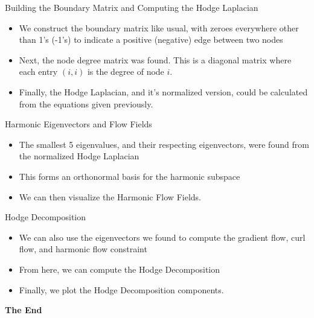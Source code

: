 \documentclass[aspectratio=169,xcolor=dvipsnames]{beamer}
\begin{document}
\begin{frame}{Building the Boundary Matrix and Computing the Hodge Laplacian}
    \begin{itemize}
        \item We construct the boundary matrix like usual, with zeroes everywhere other than 1's (-1's) to indicate a positive (negative) edge between two nodes
        \item Next, the node degree matrix was found. This is a diagonal matrix where each entry $(i,i)$ is the degree of node $i$. 
        \item Finally, the Hodge Laplacian, and it's normalized version, could be calculated from the equations given previously.
    \end{itemize}
\end{frame}

\begin{frame}{Harmonic Eigenvectors and Flow Fields}
    \begin{itemize}
        \item The smallest 5 eigenvalues, and their respecting eigenvectors, were found from the normalized Hodge Laplacian
        \item This forms an orthonormal basis for the harmonic subspace
        \item We can then visualize the Harmonic Flow Fields.
    \end{itemize}
\end{frame}

\begin{frame}{Hodge Decomposition}
    \begin{itemize}
        \item We can also use the eigenvectors we found to compute the gradient flow, curl flow, and harmonic flow constraint
        \item From here, we can compute the Hodge Decomposition
        \item Finally, we plot the Hodge Decomposition components.
    \end{itemize}
\end{frame}


\begin{frame}
    \Huge{\centerline{\textbf{The End}}}
\end{frame}

\end{document}
